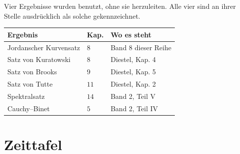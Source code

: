 \begin{merksatz}
Vier Ergebnisse wurden benutzt, ohne sie herzuleiten. Alle vier sind an ihrer Stelle ausdrücklich als solche gekennzeichnet.

\begin{center}
{\small
\renewcommand{\arraystretch}{1.5}
\begin{tabular}{@{}P{3.0cm}P{1.4cm}P{3.8cm}@{}}
\toprule
\textbf{Ergebnis} & \textbf{Kap.} & \textbf{Wo es steht}\\
\midrule
Jordanscher Kurvensatz & $8$ & Band 8 dieser Reihe\\
Satz von Kuratowski & $8$ & Diestel, Kap. 4\\
Satz von Brooks & $9$ & Diestel, Kap. 5\\
Satz von Tutte & $11$ & Diestel, Kap. 2\\
Spektralsatz & $14$ & Band 2, Teil V\\
Cauchy--Binet & $5$ & Band 2, Teil IV\\
\bottomrule
\end{tabular}}
\end{center}

\begin{center}
\begin{minipage}{0.88\textwidth}
\end{minipage}
\end{center}
\end{merksatz}

\section{Zeittafel}

